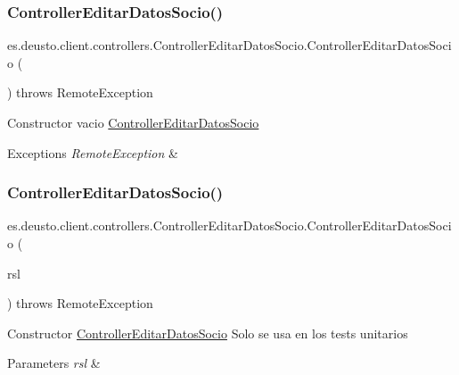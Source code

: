\subsubsection{\texorpdfstring{ControllerEditarDatosSocio()}{ControllerEditarDatosSocio()}\hspace{0.1cm}{\footnotesize\ttfamily [1/2]}}
{\footnotesize\ttfamily es.\+deusto.\+client.\+controllers.\+Controller\+Editar\+Datos\+Socio.\+Controller\+Editar\+Datos\+Socio (\begin{DoxyParamCaption}{ }\end{DoxyParamCaption}) throws Remote\+Exception}

Constructor vacio \mbox{\hyperlink{classes_1_1deusto_1_1client_1_1controllers_1_1_controller_editar_datos_socio}{Controller\+Editar\+Datos\+Socio}} 
\begin{DoxyExceptions}{Exceptions}
{\em Remote\+Exception} & \\
\hline
\end{DoxyExceptions}
\mbox{\label{classes_1_1deusto_1_1client_1_1controllers_1_1_controller_editar_datos_socio_abddd458cf9a7536335bf85d8431e0e82}} 
\subsubsection{\texorpdfstring{ControllerEditarDatosSocio()}{ControllerEditarDatosSocio()}\hspace{0.1cm}{\footnotesize\ttfamily [2/2]}}
{\footnotesize\ttfamily es.\+deusto.\+client.\+controllers.\+Controller\+Editar\+Datos\+Socio.\+Controller\+Editar\+Datos\+Socio (\begin{DoxyParamCaption}\item[{\mbox{\hyperlink{classes_1_1deusto_1_1client_1_1remote_1_1_service_locator}{Service\+Locator}}}]{rsl }\end{DoxyParamCaption}) throws Remote\+Exception}

Constructor \mbox{\hyperlink{classes_1_1deusto_1_1client_1_1controllers_1_1_controller_editar_datos_socio}{Controller\+Editar\+Datos\+Socio}} Solo se usa en los tests unitarios 
\begin{DoxyParams}{Parameters}
{\em rsl} & \\
\hline
\end{DoxyParams}

